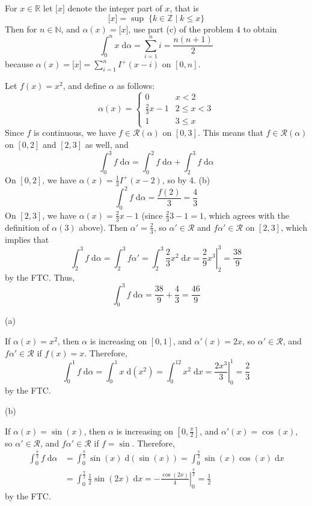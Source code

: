 \documentclass{homework}
\begin{document}
	
	For $x \in \mathbb{R}$ let $\lbrack x\rbrack$ denote the integer part of $x$, that is
	$$
	\lbrack x\rbrack = \sup\; \{k \in \mathbb{Z} \mid k \le x\}
	$$
	Then for $n \in \mathbb{N}$, and $\alpha(x) = \lbrack x\rbrack$, use part (c) of the problem 4 to obtain
	$$
	\int_0^n x\;\text{d}\alpha = \sum_{i=1}^n i = \frac{n(n+1)}{2} 
	$$
	because $\alpha(x) = \lbrack x\rbrack = \sum_{i=1}^nI^+(x-i)$ on $[0, n]$.
	
	
	Let $f(x) = x^2$, and define $\alpha$ as follows:
	$$
	\alpha(x) = \begin{cases}
		0 & x < 2 \\
		\frac{2}{3}x - 1 & 2 \le x < 3 \\
		1 & 3 \le x
	\end{cases}
	$$
	Since $f$ is continuous, we have $f \in \mathscr{R}(\alpha)$ on $[0,3]$. This means that $f\in\mathscr{R}(\alpha)$ on $[0,2]$ and $[2,3]$ as well, and
	$$
	\int_0^3f\;\text{d}\alpha = \int_0^2f\;\text{d}\alpha + \int_2^3f\;\text{d}\alpha
	$$
	On $[0,2]$, we have $\alpha(x) = \frac{1}{3}I^+(x- 2)$, so by 4. (b)
	$$
	\int_0^2 f\;\text{d}\alpha = \frac{f(2)}{3} = \frac{4}{3}
	$$
	On $[2,3]$, we have $\alpha(x) = \frac{2}{3}x - 1$ (since $\frac{2}{3}3 -1 = 1$, which agrees with the definition of $\alpha(3)$ above). Then $\alpha' = \frac{2}{3}$, so $\alpha' \in \mathscr{R}$ and $f\alpha' \in\mathscr{R}$ on $[2,3]$, which implies that
	$$
	\int_2^3f\;\text{d}\alpha = \int_2^3f\alpha' = \int_2^3\frac{2}{3}x^2\;\text{d}x = \left.\frac{2}{9}x^3\right|_2^3 = \frac{38}{9}
	$$
	by the FTC. Thus,
	$$
	\int_0^3 f\;\text{d}\alpha = \frac{38}{9} + \frac{4}{3} = \frac{46}{9}
	$$
	
	
	\begin{alphaparts}
		\questionpart (a)
	
		If $\alpha(x) = x^2$, then $\alpha$ is increasing on $[0,1]$, and $\alpha'(x) = 2x$, so $\alpha' \in \mathscr{R}$, and $f\alpha' \in \mathscr{R}$ if $f(x) = x$. Therefore,
		$$
		\int_0^1f\;\text{d}\alpha = \int_0^1x\;\text{d}\left(x^2\right) = \int_0^12x^2\;\text{d}x=\left.\frac{2x^3}{3}\right|_0^1 = \frac{2}{3}
		$$
		by the FTC.
		
		\questionpart (b)
		
		If $\alpha(x) = \sin(x)$, then $\alpha$ is increasing on $\left[0,\frac{\pi}{2}\right]$, and $\alpha'(x) =\cos(x)$, so $\alpha' \in \mathscr{R}$, and $f\alpha' \in \mathscr{R}$ if $f = \sin$. Therefore,
		$$
		\begin{aligned}
			\int_0^{\frac{\pi}{2}} f\;\text{d}\alpha &= \int_0^\frac{\pi}{2}\sin(x)\;\text{d}\left(\sin(x)\right) = \int_0^{\frac{\pi}{2}}\sin(x)\cos(x)\;\text{d}x\\
			&= \int_0^\frac{\pi}{2}\frac{1}{2}\sin(2x)\;\text{d}x = -\left.\frac{\cos(2x)}{4}\right|_0^\frac{\pi}{2} = \frac{1}{2}
		\end{aligned}
		$$
	by the FTC.
	\end{alphaparts}
	
\end{document}
